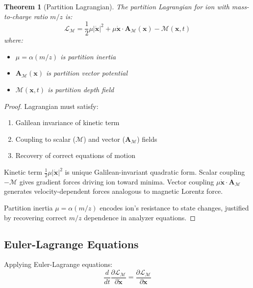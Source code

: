 \documentclass[twocolumn,10pt]{revtex4-2}
\newtheorem{theorem}{Theorem}[section]
\theoremstyle{definition}
\theoremstyle{remark}
\newcommand{\Mdepth}{\mathcal{M}}
\newcommand{\Lagr}{\mathcal{L}}
\newcommand{\Apartition}{\mathbf{A}_{\Mdepth}}
\newcommand{\partinert}{\mu}
\begin{document}
\begin{theorem}[Partition Lagrangian]
\label{thm:lagrangian}
The partition Lagrangian for ion with mass-to-charge ratio $m/z$ is:
\begin{equation}
\boxed{\Lagr_{\Mdepth} = \frac{1}{2}\partinert|\dot{\mathbf{x}}|^2 + \partinert\dot{\mathbf{x}}\cdot\Apartition(\mathbf{x}) - \Mdepth(\mathbf{x}, t)}
\label{eq:partition_lagrangian}
\end{equation}
where:
\begin{itemize}
\item $\partinert = \alpha(m/z)$ is partition inertia
\item $\Apartition(\mathbf{x})$ is partition vector potential
\item $\Mdepth(\mathbf{x}, t)$ is partition depth field
\end{itemize}
\end{theorem}

\begin{proof}
Lagrangian must satisfy:
\begin{enumerate}
\item Galilean invariance of kinetic term
\item Coupling to scalar ($\Mdepth$) and vector ($\Apartition$) fields
\item Recovery of correct equations of motion
\end{enumerate}

Kinetic term $\frac{1}{2}\partinert|\dot{\mathbf{x}}|^2$ is unique Galilean-invariant quadratic form. Scalar coupling $-\Mdepth$ gives gradient forces driving ion toward minima. Vector coupling $\partinert\dot{\mathbf{x}}\cdot\Apartition$ generates velocity-dependent forces analogous to magnetic Lorentz force.

Partition inertia $\partinert = \alpha(m/z)$ encodes ion's resistance to state changes, justified by recovering correct $m/z$ dependence in analyzer equations.
\end{proof}

\subsection{Euler-Lagrange Equations}

Applying Euler-Lagrange equations:
\begin{equation}
\frac{d}{dt}\frac{\partial \Lagr_{\Mdepth}}{\partial \dot{\mathbf{x}}} = \frac{\partial \Lagr_{\Mdepth}}{\partial \mathbf{x}}
\label{eq:euler_lagrange}
\end{equation}
\end{document}
